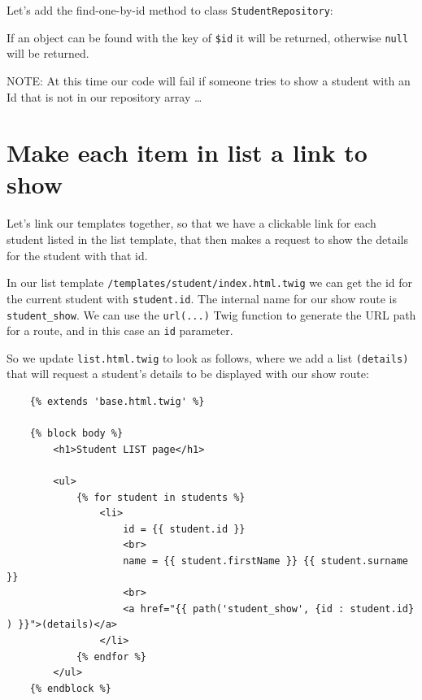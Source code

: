 \documentclass[a4paperpaper,openright]{book}
\newenvironment{Shaded}{}{}
\newcommand{\FunctionTok}[1]{\textcolor[rgb]{0.02,0.16,0.49}{#1}}
\newcommand{\KeywordTok}[1]{\textcolor[rgb]{0.00,0.44,0.13}{\textbf{#1}}}
\newcommand{\NormalTok}[1]{#1}
\newcommand{\OtherTok}[1]{\textcolor[rgb]{0.00,0.44,0.13}{#1}}
\begin{document}
Let's add the find-one-by-id method to class \texttt{StudentRepository}:

\begin{Shaded}
\end{Shaded}

If an object can be found with the key of \texttt{\$id} it will be
returned, otherwise \texttt{null} will be returned.

NOTE: At this time our code will fail if someone tries to show a student
with an Id that is not in our repository array \ldots{}

\hypertarget{make-each-item-in-list-a-link-to-show}{%
\section{Make each item in list a link to
show}\label{make-each-item-in-list-a-link-to-show}}

Let's link our templates together, so that we have a clickable link for
each student listed in the list template, that then makes a request to
show the details for the student with that id.

In our list template \texttt{/templates/student/index.html.twig} we can
get the id for the current student with \texttt{student.id}. The
internal name for our show route is \texttt{student\_show}. We can use
the \texttt{url(...)} Twig function to generate the URL path for a
route, and in this case an \texttt{id} parameter.

So we update \texttt{list.html.twig} to look as follows, where we add a
list \texttt{(details)} that will request a student's details to be
displayed with our show route:

\begin{verbatim}
    {% extends 'base.html.twig' %}

    {% block body %}
        <h1>Student LIST page</h1>

        <ul>
            {% for student in students %}
                <li>
                    id = {{ student.id }}
                    <br>
                    name = {{ student.firstName }} {{ student.surname }}
                    <br>
                    <a href="{{ path('student_show', {id : student.id} ) }}">(details)</a>
                </li>
            {% endfor %}
        </ul>
    {% endblock %}
\end{verbatim}
\end{document}
